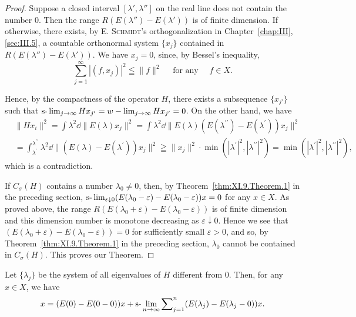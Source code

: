 \begin{proof}
 Suppose a closed interval $[\lambda', \lambda'']$ on the real line does not contain the number $0$. Then the range $R(E(\lambda'') - E(\lambda'))$ is of finite dimension. If otherwise, there exists, by E. \textsc{Schmidt}'s orthogonalization in Chapter~\ref{chap:III}, \ref{sec:III.5}, a countable orthonormal system $\{x_j\}$ contained in $R(E(\lambda'') - E(\lambda'))$. We have \wlim $x_j = 0$, since, by Bessel's inequality, 
\[
\sum\limits_{j=1} ^{\infty} | (f, x _{j}) | ^{2} \leqq \| f \| ^{2} \quad \text{ for any } \quad f \in X. \]

Hence, by the compactness of the operator $H$, there exists a subsequence $\{x_{j'}\}$ such that $\text{s-}\lim\nolimits_{j \to \infty} H x_{j'} = w - \lim\nolimits_{j \to \infty} H x_{j'} = 0$. On the other hand, we have 
\[
\begin{aligned}
&\| H x _{i} \| ^{2}  = \int \lambda^{2} \dd \| E (\lambda) x _{j} \| ^{2} = \int \lambda^{2} \dd \| E (\lambda) (E (\lambda^{\prime \prime}) - E (\lambda^{\prime})) x _{j} \| ^{2} \\
&= \int_ {\lambda^{\prime}} ^ {\lambda^{\prime \prime}} \lambda^{2} \dd \| (E (\lambda) - E (\lambda^{\prime})) x _{j} \| ^{2} \geqq \| x _{j} \| ^{2} \cdot \min (| \lambda^{\prime} | ^{2}, | \lambda^{\prime \prime} | ^{2}) = \min (| \lambda^{\prime} | ^{2}, | \lambda^{\prime \prime} | ^{2}),
\end{aligned}
\]
which is a contradiction. 

If $C_{\sigma}(H)$ contains a number $\lambda_0 \neq 0$, then, by Theorem~\ref{thm:XI.9.Theorem.1} in the preceding section, $\text{s-}\lim\nolimits_{\varepsilon \downarrow 0} (E(\lambda_0 - \varepsilon) - E(\lambda_0 - \varepsilon)) x = 0$ for any $x \in X$. As proved above, the range $R(E(\lambda_0 + \varepsilon) - E(\lambda_0 - \varepsilon))$ is of finite dimension and this dimension number is monotone decreasing as $\varepsilon \downarrow 0$. Hence we see that $(E(\lambda_0 + \varepsilon) - E(\lambda_0 - \varepsilon)) = 0$ for sufficiently small $\varepsilon > 0$, and so, by Theorem~\ref{thm:XI.9.Theorem.1} in the preceding section, $\lambda_0$ cannot be contained in $C_{\sigma}(H)$. This proves our Theorem. 
\end{proof}

\begin{corollary}\label{cor:XI.9.Corollary.1} Let $\{\lambda_j\}$ be the system of all eigenvalues of $H$ different from $0$. Then, for any $x \in X$, we have 
\begin{equation}\label{eq:XI.9.2}
x = (E (0) - E (0 - 0)) x + \text{s-}\lim _{n \rightarrow \infty} \sum\nolimits_{j=1} ^{n} (E (\lambda_{j}) - E (\lambda_{j} - 0)) x.
\end{equation}
\end{corollary}


